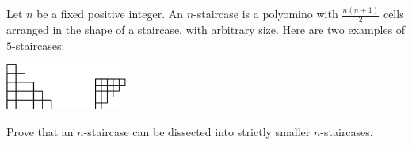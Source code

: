 Let $n$ be a fixed positive integer. An $n$-staircase is a polyomino with $\frac{n(n+1)}{2}$ cells arranged in the shape of a staircase, with arbitrary size. Here are two examples of $5$-staircases:

\begin{center}
	\includegraphics[width = 0.3\textwidth]{pic.png}
\end{center}

Prove that an $n$-staircase can be dissected into strictly smaller $n$-staircases.
